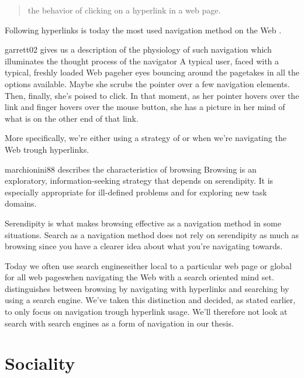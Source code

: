 \begin{quote}
  the behavior of clicking on a hyperlink in a web page.
\end{quote}

Following hyperlinks is
today the most used navigation method on the Web \citep[]{weinreich08}.
\begin{fullquote}{garrett02}{%
  gives us a description of the physiology of such navigation which
  illuminates the thought process of the navigator}
    A typical user, faced with a typical, freshly loaded Web page\dash{}her
    eyes bouncing around the page\dash{}takes in all the options available.
    Maybe she scrubs the pointer over a few navigation elements. Then,
    finally, she's poised to click. In that moment, as her pointer hovers over
    the link and finger hovers over the mouse button, she has a picture in her
    mind of what is on the other end of that link.
\end{fullquote}

More specifically, we're either using a strategy of  or
 when we're navigating the Web trough hyperlinks.
\begin{fullquote}[\p{71}]{marchionini88}{%
  describes the characteristics of browsing}
    Browsing is an exploratory, information-seeking
    strategy that depends on serendipity. It is
    especially appropriate for ill-defined problems
    and for exploring new task domains.
\end{fullquote}
Serendipity\dash{}%
\dash{}is what makes browsing effective as a navigation method in some
situations.
Search as a navigation method does not rely on serendipity as much as browsing
since you have a clearer idea about what you're navigating towards.

Today we often use search engines\dash{}either local to a particular web page
or global for all web pages\dash{}when
navigating the Web with a search oriented mind set.
\citet[]{freyne07} distinguishes between browsing by navigating
with hyperlinks and searching by using a search engine. We've taken this
distinction and decided, as stated earlier, to only focus on navigation
trough hyperlink usage. We'll therefore not look at search with search engines
as a form of navigation in our thesis.

\section{Sociality}

